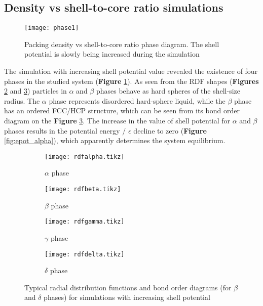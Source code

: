 \subsection{Density vs shell-to-core ratio simulations}\label{secqc1}

\begin{figure}
 \centering
 \texttt{[image: phase1]}
\caption{Packing density vs shell-to-core ratio phase diagram. The shell potential is slowly being increased during the simulation} 
\label{fig:phase}
\end{figure}

The simulation with increasing shell potential value revealed the existence of four phases in the studied system (\textbf{Figure} \ref{fig:phase}). As seen from the RDF shapes (\textbf{Figures} \ref{fig:rdf_alpha} and \ref{fig:rdf_beta}) particles in $\alpha$ and $\beta$  phases behave as hard spheres of the shell-size radius. The $\alpha$ phase represents disordered hard-sphere liquid, while the $\beta$ phase has an ordered FCC/HCP %
structure, which can be seen from its bond order diagram on the \textbf{Figure} \ref{fig:rdf_beta}. The increase in the value of shell potential for $\alpha$ and $\beta$ phases results in the %
potential energy / $\epsilon$ decline to zero (\textbf{Figure} \ref{fig:epot_alpha}), which apparently determines the system equilibrium. 

\begin{figure}%
\centering
\begin{subfigure}{.24\textwidth}
  \centering
  \texttt{[image: rdfalpha.tikz]}
  \caption{$\alpha$ phase}
  \label{fig:rdf_alpha} 
\end{subfigure}
\begin{subfigure}{.24\textwidth}
  \centering
   \texttt{[image: rdfbeta.tikz]}
  \caption{$\beta$ phase}
  \label{fig:rdf_beta}  
\end{subfigure}
\begin{subfigure}{.24\textwidth}
  \centering
  \texttt{[image: rdfgamma.tikz]}
  \caption{$\gamma$ phase}
  \label{fig:rdf_gamma} 
\end{subfigure}
\begin{subfigure}{.24\textwidth}
  \centering
   \texttt{[image: rdfdelta.tikz]}
  \caption{$\delta$ phase}
  \label{fig:rdf_delta}  
\end{subfigure}
\caption{Typical radial distribution functions and bond order diagrams (for $\beta$ and $\delta$ phases) for simulations with increasing shell potential}
\label{fig:rdf1}
\end{figure}

